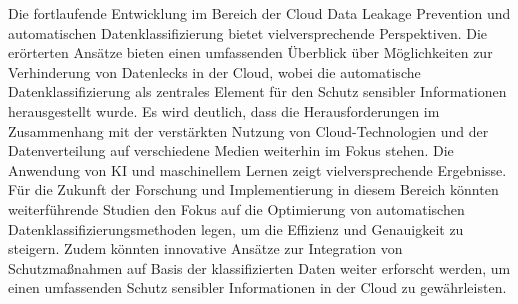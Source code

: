 Die fortlaufende Entwicklung im Bereich der Cloud Data Leakage Prevention und automatischen Datenklassifizierung bietet vielversprechende Perspektiven. Die erörterten Ansätze bieten einen umfassenden Überblick über Möglichkeiten zur Verhinderung von Datenlecks in der Cloud, wobei die automatische Datenklassifizierung als zentrales Element für den Schutz sensibler Informationen herausgestellt wurde. Es wird deutlich, dass die Herausforderungen im Zusammenhang mit der verstärkten Nutzung von Cloud-Technologien und der Datenverteilung auf verschiedene Medien weiterhin im Fokus stehen. Die Anwendung von KI und maschinellem Lernen zeigt vielversprechende Ergebnisse.
Für die Zukunft der Forschung und Implementierung in diesem Bereich könnten weiterführende Studien den Fokus auf die Optimierung von automatischen Datenklassifizierungsmethoden legen, um die Effizienz und Genauigkeit zu steigern. Zudem könnten innovative Ansätze zur Integration von Schutzmaßnahmen auf Basis der klassifizierten Daten weiter erforscht werden, um einen umfassenden Schutz sensibler Informationen in der Cloud zu gewährleisten.